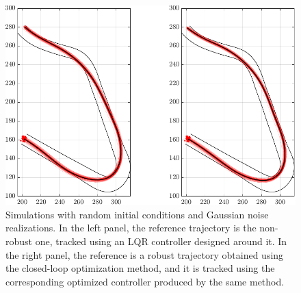 \begin{figure}
	\centering
	\includegraphics{Fig/olcl_traj_strings.pdf}
	\caption{Simulations with random initial conditions and Gaussian noise realizations. In the left panel, the reference trajectory is the non-robust one, tracked using an LQR controller designed around it. In the right panel, the reference is a robust trajectory obtained using the closed-loop optimization method, and it is tracked using the corresponding optimized controller produced by the same method.}
	\label{fig:traj_strings}
\end{figure}